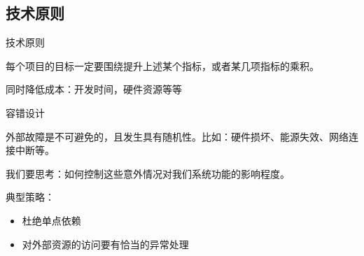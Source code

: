 \documentclass{beamer}
\begin{document}
\begin{CJK}{UTF8}{gbsn}


\section{技术原则}

\begin{frame}{技术原则}

  每个项目的目标一定要围绕提升上述某个指标，或者某几项指标的乘积。

  同时降低成本：开发时间，硬件资源等等


\end{frame}

\begin{frame}{容错设计}

  外部故障是不可避免的，且发生具有随机性。比如：硬件损坏、能源失效、网络连接中断等。

  我们要思考：如何控制这些意外情况对我们系统功能的影响程度。

  典型策略：

  \begin{itemize}
    \item { 杜绝单点依赖 }
    \item { 对外部资源的访问要有恰当的异常处理 }
  \end{itemize}


\end{frame}
\end{CJK}
\end{document}
